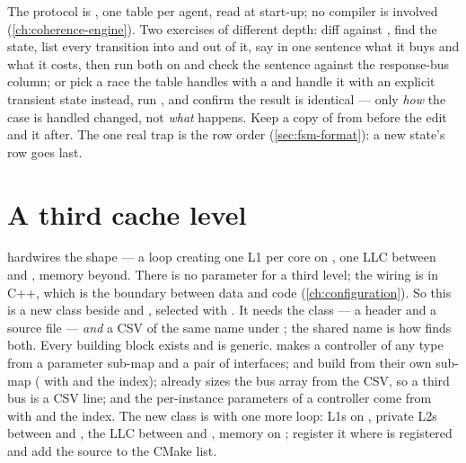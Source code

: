 The protocol is , one table per agent, read at start-up; no compiler
is involved (\cref{ch:coherence-engine}). Two exercises of different depth: diff
 against , find the
 state, list every transition into and out of it, say in one sentence what it buys and
what it costs, then run both on  and check the sentence against the response-bus
column; or pick a race the table handles with a  and handle it with an explicit
transient state instead, run , and confirm the result is identical --- only
\emph{how} the case is handled changed, not \emph{what} happens. Keep a copy of
 from before the edit and  it after. The one real trap is the row
order (\cref{sec:fsm-format}): a new state's row goes last.

\section{A third cache level}

 hardwires the shape --- a loop creating one
L1 per core on , one LLC between  and , memory beyond.
There is no parameter for a third level; the wiring is in C++, which is the boundary between
data and code (\cref{ch:configuration}). So this is a new class beside 
and , selected with . It needs the
class --- a header and a source file --- \emph{and} a CSV of the same name under
; the shared name is how  finds both. Every
building block exists and is generic.  makes a controller of any type
from a parameter sub-map and a pair of interfaces;  and  build from
their own sub-map ( with  and the index);  already
sizes the bus array from the CSV, so a third bus is a CSV line; and the per-instance parameters
of a controller come from  with  and the index. The new class is
 with one more loop: L1s on , private L2s between
 and , the LLC between  and , memory on
; register it where  is registered and add the source to
the  CMake list.


